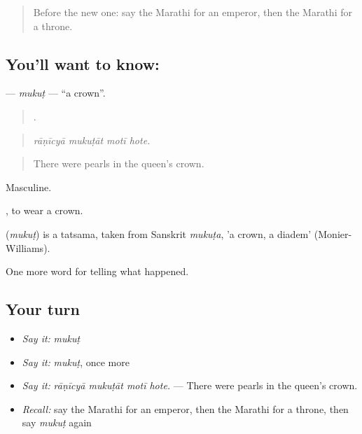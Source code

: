 \label{lesson:MR-C326-mukut}



\begin{quote}
Before the new one: say the Marathi for an emperor, then the Marathi for a throne.
\end{quote}

\subsection*{You'll want to know: }
\textbf{} — \emph{mukuṭ} — \textquotedblleft{}a crown\textquotedblright{}.

\begin{quote}
   .
\end{quote}

\begin{quote}
\emph{rāṇīcyā mukuṭāt motī hote.}
\end{quote}

\begin{quote}
There were pearls in the queen's crown.
\end{quote}

Masculine.

 , to wear a crown.

\begin{cousinweb}
\textbf{} (\emph{mukuṭ}) is a tatsama, taken from Sanskrit \emph{mukuṭa}, 'a crown, a diadem' (Monier-Williams).
\end{cousinweb}

\begin{grammarlens}[title={What you've built}]
One more word for telling what happened.
\end{grammarlens}

\subsection*{Your turn}
\begin{itemize}
\raggedright
  \item \emph{Say it:} \emph{mukuṭ}
  \item \emph{Say it:} \emph{mukuṭ}, once more
  \item \emph{Say it:} \emph{rāṇīcyā mukuṭāt motī hote.} — There were pearls in the queen's crown.
  \item \emph{Recall:} say the Marathi for an emperor, then the Marathi for a throne, then say \emph{mukuṭ} again
\end{itemize}

